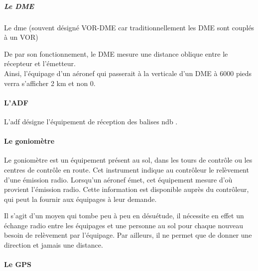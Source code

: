 			
			\subparagraph{Le DME}
			Le \acrshort{dme}  (souvent désigné VOR-DME car traditionnellement les DME sont couplés à un VOR)
			
			\alert{De par son fonctionnement, le DME mesure une distance oblique entre le récepteur et l'émetteur. \\ Ainsi, l'équipage d'un aéronef qui passerait à la verticale d'un DME à 6000 pieds verra s'afficher 2 km et non 0.}
			
			\paragraph{L'ADF}
			L'\acrshort{adf}  désigne l'équipement de réception des balises \acrshort{ndb} .
			
			\paragraph{Le goniomètre}
			Le \gls{goniomètre} est un équipement présent au sol, dans les tours de contrôle ou les centres de contrôle en route. Cet instrument indique au contrôleur le relèvement d'une émission radio. Lorsqu'un aéronef émet, cet équipement mesure d'où provient l'émission radio. Cette information est disponible auprès du contrôleur, qui peut la fournir aux équipages à leur demande.
			
			Il s'agit d'un moyen qui tombe peu à peu en désuétude, il nécessite en effet un échange radio entre les équipages et une personne au sol pour chaque nouveau besoin de relèvement par l'équipage. Par ailleurs, il ne permet que de donner une direction et jamais une distance.
			
			\paragraph{Le GPS}
